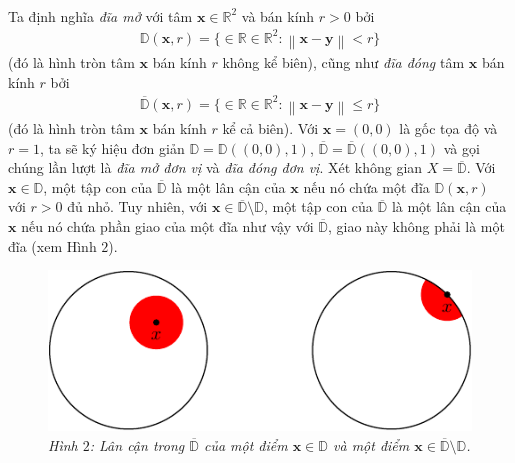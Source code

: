 \begin{multicols}{2}
\begin{align*}
	\end{align*}
	Ta định nghĩa {\it đĩa mở} với tâm $\mathbf{x} \in \mathbb{R}^2$ và bán kính $r > 0$ bởi
	\begin{align*}
		\mathbb{D}(\mathbf{x}, r) = \{ \in \mathbb{R} \in \mathbb{R}^2:  \left\|\mathbf{x} - \mathbf{y}\right\| < r\}
	\end{align*}
	(đó là hình tròn tâm $\mathbf{x}$ bán kính $r$ không kể biên), cũng như {\it đĩa đóng} tâm $\mathbf{x}$ bán kính $r$ bởi
	\begin{align*}
		\overline{\mathbb{D}}(\mathbf{x}, r) = \{ \in \mathbb{R} \in \mathbb{R}^2:  \left\|\mathbf{x} - \mathbf{y}\right\| \le r\}
	\end{align*}
	(đó là hình tròn tâm $\mathbf{x}$ bán kính $r$ kể cả biên). Với $\mathbf{x} = (0,0)$ là gốc tọa độ và $r = 1$, ta sẽ ký hiệu đơn giản $\mathbb{D} = \mathbb{D}((0,0),1)$, $\overline{\mathbb{D}} = \overline{\mathbb{D}}((0,0),1)$ và gọi chúng lần lượt là {\it đĩa mở đơn vị} và {\it đĩa đóng đơn vị}. Xét không gian $X = \overline{\mathbb{D}}$. Với $\mathbf{x} \in \mathbb{D}$, một tập con của $\overline{\mathbb{D}}$ là một lân cận của $\mathbf{x}$ nếu nó chứa một đĩa $\mathbb{D}(\mathbf{x},r)$ với $r > 0$ đủ nhỏ. Tuy nhiên, với $\mathbf{x} \in \overline{\mathbb{D}} \setminus \mathbb{D}$, một tập con của $\overline{\mathbb{D}}$ là một lân cận của $\mathbf{x}$ nếu nó chứa phần giao của một đĩa như vậy với $\overline{\mathbb{D}}$, giao này không phải là một đĩa (xem Hình $2$).
	\begin{figure}[H]
		\vspace*{-5pt}
		\centering\captionsetup{labelformat=empty, justification=centering}
		\includegraphics[width=1\linewidth]{H2.pdf}
		\caption{\small\textit{\color{duongvaotoanhoc}Hình $2$: Lân cận trong $\overline{\mathbb{D}}$ của một điểm $\mathbf{x} \in \mathbb{D}$ và một điểm $\mathbf{x} \in \overline{\mathbb{D}} \setminus \mathbb{D}$.}}
		\vspace*{-10pt}
	\end{figure}

\end{multicols}
